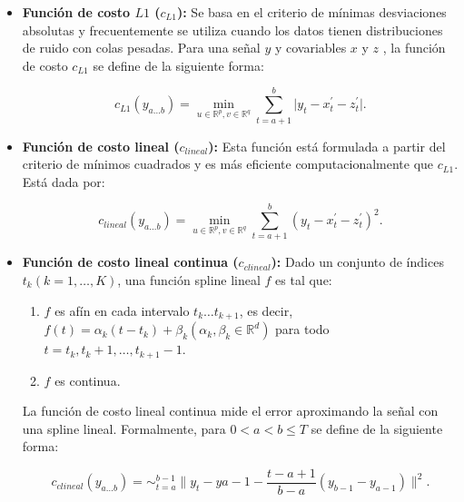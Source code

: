 \documentclass{article}[14pts]
\providecommand{\abs}[1]{\lvert#1\rvert}
\begin{document}
      \begin{itemize}

        \item \textbf{Función de costo $L1$ ($c_{L1}$):} Se basa en el criterio de mínimas desviaciones absolutas y frecuentemente se utiliza cuando los datos tienen distribuciones de ruido con colas pesadas. Para una señal $y$ y covariables $x$ y $z$ , la función de costo $c_{L1}$ se define de la siguiente forma:
          
          \begin{equation}
            c_{L1}(y_{a\dots b}) = \min_{u \in \mathbb{R}^{p}, v \in \mathbb{R}^{q}} \sum_{t= a+1}^{b} \abs{y_{t} - x_{t}^{'} - z_{t}^{'}}.
          \end{equation}
          
        \item \textbf{Función de costo lineal ($c_{lineal}$):} Esta función está formulada a partir del criterio de mínimos cuadrados y es más eficiente computacionalmente que $c_{L1}$. Está dada por:
          
          \begin{equation}
            c_{lineal}(y_{a\dots b}) = \min_{u \in \mathbb{R}^{p}, v \in \mathbb{R}^{q}} \sum_{t= a+1}^{b} (y_{t} - x_{t}^{'} - z_{t}^{'})^{2}.
          \end{equation}
          
        \item \textbf{Función de costo lineal continua ($c_{clineal}$):}  Dado un conjunto de índices $t_{k} (k =1, \dots, K)$, una función spline lineal $f$ es tal que:
        
          \begin{enumerate}
            \item $f$ es afín en cada intervalo $t_{k} \dots t_{k+1}$, es decir, $f(t)= \alpha_{k}(t-t_{k})+ \beta_{k} (\alpha_{k}, \beta_{k} \in \mathbb{R}^{d})$ para todo $t= t_{k}, t_{k}+1, \dots, t_{k+1}-1.$
            
            \item $f$ es continua.
          \end{enumerate}
        
        La función de costo lineal continua mide el error aproximando la señal con una spline lineal. Formalmente, para $0 < a < b \leq T$ se define de la siguiente forma:

          \begin{equation}
            c_{clineal}(y_{a\dots b}) = \sim_{t=a}^{b-1} \|y_{t}- y{a-1}- \frac{t-a+1}{b-a}(y_{b-1}-y_{a-1})\|^{2}.
          \end{equation}
    

\end{itemize}
\end{document}
